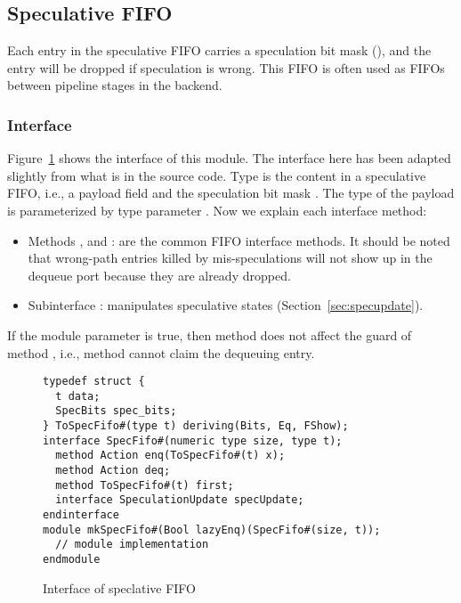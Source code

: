 \subsection{Speculative FIFO}\label{sec:specfifo}

Each entry in the speculative FIFO carries a speculation bit mask (), and the entry will be dropped if speculation is wrong.
This FIFO is often used as FIFOs between pipeline stages in the backend.

\subsubsection{Interface}

Figure~\ref{fig:specfifo-ifc} shows the interface of this module.
The interface here has been adapted slightly from what is in the source code.
Type  is the content in a speculative FIFO, i.e., a payload field  and the speculation bit mask .
The type of the payload is parameterized by type parameter .
Now we explain each interface method:
\begin{itemize}
    \item Methods ,  and : are the common FIFO interface methods.
    It should be noted that wrong-path entries killed by mis-speculations will not show up in the dequeue port because they are already dropped.
    \item Subinterface : manipulates speculative states (Section~\ref{sec:specupdate}).
\end{itemize}
If the module parameter  is true, then method  does not affect the guard of method , i.e., method  cannot claim the dequeuing entry.

\begin{figure}[t]
\begin{lstlisting}[caption={}]
typedef struct {
  t data;
  SpecBits spec_bits;
} ToSpecFifo#(type t) deriving(Bits, Eq, FShow);
interface SpecFifo#(numeric type size, type t);
  method Action enq(ToSpecFifo#(t) x);
  method Action deq;
  method ToSpecFifo#(t) first;
  interface SpeculationUpdate specUpdate;
endinterface
module mkSpecFifo#(Bool lazyEnq)(SpecFifo#(size, t));
  // module implementation
endmodule
\end{lstlisting}
\caption{Interface of speclative FIFO}\label{fig:specfifo-ifc}
\end{figure}

